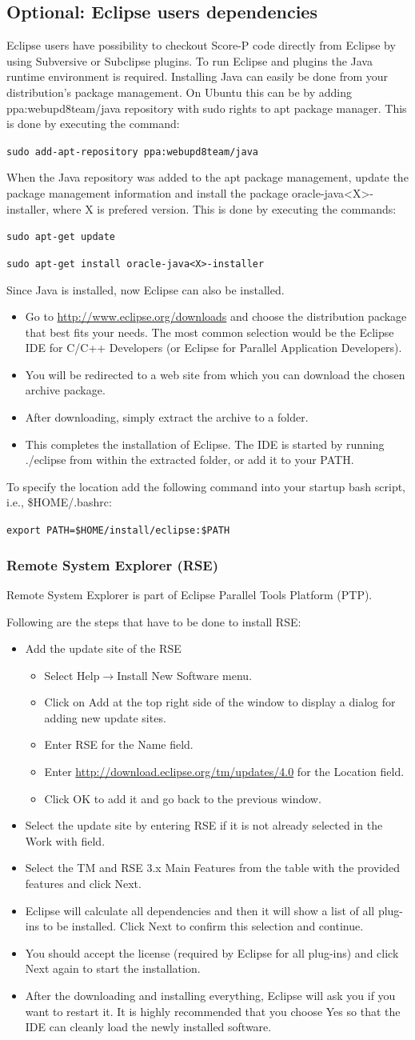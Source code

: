 \documentclass[11pt,a4paper, oneside]{book} %
\newcommand{\eclipseurl}{\url{http://www.eclipse.org/downloads} }
\newcommand{\rseurl}{\url{http://download.eclipse.org/tm/updates/4.0} }
\newcommand{\installloc}[1]{\$HOME/install/#1}
\newcommand{\ptfbrackets}[1]{\textless #1\textgreater}
\newcommand{\eclipseplugin}[3]{
Following are the steps that have to be done to install #1:
 \begin{itemize}
  \item Add the update site of the #1
  \begin{itemize}
   \item Select Help$\rightarrow$Install New Software menu.
   \item Click on Add at the top right side of the window to display a dialog
for adding new update sites.
  \item Enter #1 for the Name field.
  \item Enter #2 for the Location field.
  \item Click OK to add it and go back to the previous window.
  \end{itemize}
  \item Select the update site by entering #1 if it is not already selected in
the Work with field.
  \item Select the #3 from the table with the provided
features and click Next.
  \item Eclipse will calculate all dependencies and then it will show a list of
all plug-ins to be installed. Click Next to confirm this selection and continue.
  \item You should accept the license (required by Eclipse for all plug-ins) and
click Next again to start the installation.
  \item After the downloading and installing everything, Eclipse will ask you if
you want to restart it. It is highly recommended that you choose Yes so that the
IDE can cleanly load the newly installed software.
 \end{itemize}

}
\begin{document}
\subsection{Optional: Eclipse users dependencies}
Eclipse users have possibility to checkout Score-P code directly from Eclipse by
using Subversive or Subclipse plugins. To run Eclipse and plugins the Java
runtime environment is required. Installing Java can easily be done from your
distribution's package management. On Ubuntu this can be by adding
ppa:webupd8team/java repository with sudo rights to apt package manager. This is
done by executing the command:

\texttt{sudo add-apt-repository ppa:webupd8team/java}

When the Java repository was added to the apt package management, update the
package management information and install the package
oracle-java\ptfbrackets{X}-installer, where X is prefered version.
This is done by executing the commands:

\texttt{sudo apt-get update}

\texttt{sudo apt-get install oracle-java\ptfbrackets{X}-installer}

Since Java is installed, now Eclipse can also be installed.

 \begin{itemize}
  \item Go to \eclipseurl and choose the distribution package that best fits
your needs. The most common selection would be the Eclipse IDE for C/C++
Developers (or Eclipse for Parallel Application Developers).
  \item You will be redirected to a web site from which you can download the
chosen archive package.

  \item After downloading, simply extract the archive to a folder.
  \item This completes the installation of Eclipse. The IDE is started by
running ./eclipse from within the extracted folder, or add it to your PATH.
 \end{itemize}

To specify the location add the following command into your startup bash script,
i.e., \$HOME/.bashrc:

\texttt{export PATH=\installloc{eclipse}:\$PATH}

\subsubsection{Remote System Explorer (RSE)}
Remote System Explorer is part of Eclipse Parallel Tools Platform (PTP).
\eclipseplugin{RSE}{\rseurl}{TM and RSE 3.x Main Features}
\end{document}
